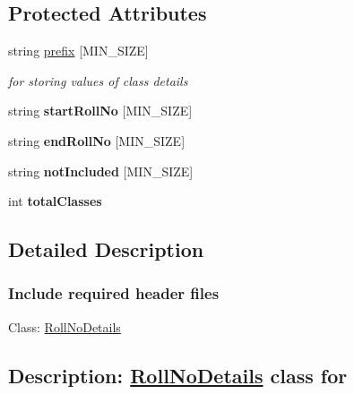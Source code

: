 \subsection*{Protected Attributes}
\begin{DoxyCompactItemize}
\item 
string \hyperlink{classRollNoDetails_a2126e353865b8e215513fe17785ef230}{prefix} \mbox{[}M\-I\-N\-\_\-\-S\-I\-Z\-E\mbox{]}
\begin{DoxyCompactList}\small\item\em for storing values of class details \end{DoxyCompactList}\item 
\hypertarget{classRollNoDetails_a441e0e8f352b04e2eb104d8a69d939c2}{string {\bfseries start\-Roll\-No} \mbox{[}M\-I\-N\-\_\-\-S\-I\-Z\-E\mbox{]}}\label{classRollNoDetails_a441e0e8f352b04e2eb104d8a69d939c2}

\item 
\hypertarget{classRollNoDetails_a8231b6d71b73f825f29a84e290d6736b}{string {\bfseries end\-Roll\-No} \mbox{[}M\-I\-N\-\_\-\-S\-I\-Z\-E\mbox{]}}\label{classRollNoDetails_a8231b6d71b73f825f29a84e290d6736b}

\item 
\hypertarget{classRollNoDetails_a1280f14b2160fb396a675bc4ba5fb85d}{string {\bfseries not\-Included} \mbox{[}M\-I\-N\-\_\-\-S\-I\-Z\-E\mbox{]}}\label{classRollNoDetails_a1280f14b2160fb396a675bc4ba5fb85d}

\item 
\hypertarget{classRollNoDetails_aa2d166949084d8f3ba6d8ab70f49282a}{int {\bfseries total\-Classes}}\label{classRollNoDetails_aa2d166949084d8f3ba6d8ab70f49282a}

\end{DoxyCompactItemize}


\subsection{Detailed Description}


 \subsubsection*{Include required header files}



 Class\-: \hyperlink{classRollNoDetails}{Roll\-No\-Details} \subsection*{Description\-: \hyperlink{classRollNoDetails}{Roll\-No\-Details} class for }

